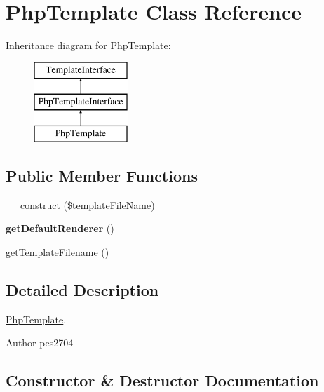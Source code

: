 \hypertarget{class_pes_1_1_view_1_1_template_1_1_php_template}{}\section{Php\+Template Class Reference}
\label{class_pes_1_1_view_1_1_template_1_1_php_template}
Inheritance diagram for Php\+Template\+:\begin{figure}[H]
\begin{center}
\leavevmode
\includegraphics[height=3.000000cm]{class_pes_1_1_view_1_1_template_1_1_php_template}
\end{center}
\end{figure}
\subsection*{Public Member Functions}
\begin{DoxyCompactItemize}
\item 
\mbox{\hyperlink{class_pes_1_1_view_1_1_template_1_1_php_template_a3d736fbbf30f0926437d65b9e69b5986}{\+\_\+\+\_\+construct}} (\$template\+File\+Name)
\item 
\mbox{\label{class_pes_1_1_view_1_1_template_1_1_php_template_a5f55a7569860e76380abf2728abc56d5}} 
{\bfseries get\+Default\+Renderer} ()
\item 
\mbox{\hyperlink{class_pes_1_1_view_1_1_template_1_1_php_template_a487e0913fe1ce30f7cc6e1091abf6fdd}{get\+Template\+Filename}} ()
\end{DoxyCompactItemize}


\subsection{Detailed Description}
\mbox{\hyperlink{class_pes_1_1_view_1_1_template_1_1_php_template}{Php\+Template}}.

\begin{DoxyAuthor}{Author}
pes2704 
\end{DoxyAuthor}


\subsection{Constructor \& Destructor Documentation}
\mbox{\label{class_pes_1_1_view_1_1_template_1_1_php_template_a3d736fbbf30f0926437d65b9e69b5986}} 

